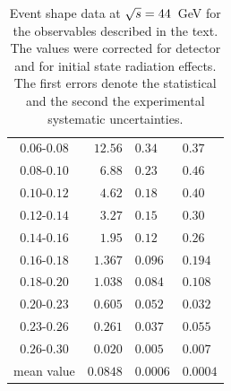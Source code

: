 \documentclass[12pt,a4paper,twoside]{article}
\begin{document}
\begin{table}[!htb]
\begin{center}
\begin{tabular}{|c||r@{ $\pm$ }l@{ $\pm$ }l|}
$ 0.06 $-$0.08  $&$  12.56  $&$     0.34  $&$     0.37    $\\
$ 0.08 $-$0.10  $&$   6.88  $&$     0.23  $&$     0.46    $\\
$ 0.10 $-$0.12  $&$   4.62  $&$     0.18  $&$     0.40    $\\
$ 0.12 $-$0.14  $&$   3.27  $&$     0.15  $&$     0.30    $\\
$ 0.14 $-$0.16  $&$   1.95  $&$     0.12  $&$     0.26    $\\
$ 0.16 $-$0.18  $&$   1.367 $&$     0.096 $&$     0.194   $\\
$ 0.18 $-$0.20  $&$   1.038 $&$     0.084 $&$     0.108   $\\
$ 0.20 $-$0.23  $&$   0.605 $&$     0.052 $&$     0.032   $\\
$ 0.23 $-$0.26  $&$   0.261 $&$     0.037 $&$     0.055   $\\
$ 0.26 $-$0.30  $&$   0.020 $&$     0.005 $&$     0.007   $\\
\hline\hline
mean value       &$  0.0848 $&$     0.0006 $&$    0.0004 $\\
\hline
\end{tabular}
\end{center}
\caption[dummy]{\label{tab-eventshapes-44GeV}
Event shape data at $\protect\sqrt{s}=44$~GeV for the observables 
described in the text. The values were corrected for detector 
and for initial state radiation effects. 
The first errors denote the statistical and the second 
the experimental systematic uncertainties.
}
\end{table}

\newpage
\end{document}
